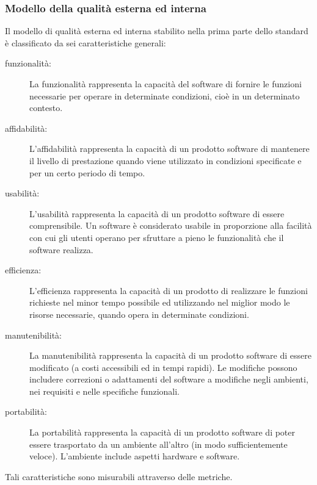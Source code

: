 \documentclass[../PianoDiQualifica.tex]{subfiles}
\begin{document}
\begin{appendices}
		\subsubsection{Modello della qualità esterna ed interna}
		Il modello di qualità esterna ed interna stabilito nella prima parte dello standard è classificato da sei caratteristiche generali:
		\begin{description}
			\item[funzionalità:] La funzionalità rappresenta la capacità del software di fornire le funzioni necessarie per operare in determinate condizioni, cioè in un determinato contesto.
			\item[affidabilità:] L'affidabilità rappresenta la capacità di un prodotto software di mantenere il livello di prestazione quando viene utilizzato in condizioni specificate e per un certo periodo di tempo.
			\item[usabilità:] L'usabilità rappresenta la capacità di un prodotto software di essere comprensibile. Un software è considerato usabile in proporzione alla facilità con cui gli utenti operano per sfruttare a pieno le funzionalità che il software realizza.
			\item[efficienza:] L'efficienza rappresenta la capacità di un prodotto di realizzare le funzioni richieste nel minor tempo possibile ed utilizzando nel miglior modo le risorse necessarie, quando opera in determinate condizioni.
			\item[manutenibilità:] La manutenibilità rappresenta la capacità di un prodotto software di essere modificato (a costi accessibili ed in tempi rapidi). Le modifiche possono includere correzioni o adattamenti del software a modifiche negli ambienti, nei requisiti e nelle specifiche funzionali.
			\item[portabilità:] La portabilità rappresenta la capacità di un prodotto software di poter essere trasportato da un ambiente all'altro (in modo sufficientemente veloce). L'ambiente include aspetti hardware e software.
		\end{description}
		Tali caratteristiche sono misurabili attraverso delle metriche.
		

\end{appendices}
\end{document}
